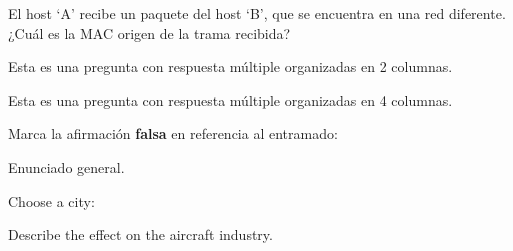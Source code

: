 \documentclass[english]{arco-exam}
\begin{document}
\begin{questions}
\begin{simpleQuestion}
  El host `A' recibe un paquete del host `B', que se encuentra en una red
    diferente. ¿Cuál es la MAC origen de la trama recibida?

\end{simpleQuestion}


\begin{simpleQuestion}
  Esta es una pregunta con respuesta múltiple organizadas en 2
  columnas.

  \begin{multicols}{2}
  \end{multicols}
\end{simpleQuestion}



\begin{simpleQuestion}
  Esta es una pregunta con respuesta múltiple organizadas en 4 columnas.

  \begin{multicols}{4}
  \end{multicols}

\end{simpleQuestion}


\begin{simpleQuestion}[1]
  Marca la afirmación \textbf{falsa} en referencia al entramado:

\end{simpleQuestion}


  \begin{multiQuestion}[12]
    Enunciado general.

    \begin{parts}
    \subQuestion[]
      Choose a city:


    \subQuestion[]
      Describe the effect on the aircraft industry.


\end{parts}
\end{multiQuestion}
\end{questions}
\end{document}
